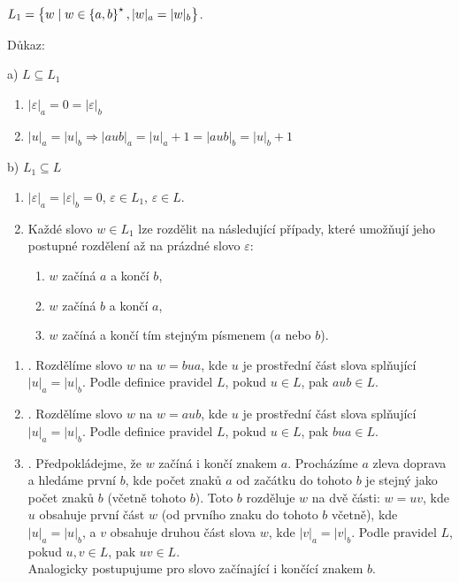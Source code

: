 $L_1 = \left\lbrace w \mid w \in \left\lbrace a,b \right\rbrace^\star, |w|_a=|w|_b \right\rbrace$.

Důkaz:

a) $L \subseteq L_1$

\begin{enumerate}
    \item $|\varepsilon|_a = 0 = |\varepsilon|_b$
    \item $|u|_a = |u|_b \Rightarrow |aub|_a = |u|_a + 1 = |aub|_b = |u|_b + 1$
\end{enumerate}

b) $L_1 \subseteq L$

\begin{enumerate}
    \item $|\varepsilon|_a = |\varepsilon|_b = 0$, $\varepsilon \in L_1$, $\varepsilon \in L$.
    \item Každé slovo $w \in L_1$ lze rozdělit na následující případy, které umožňují jeho postupné rozdělení až na
    prázdné slovo $\varepsilon$:
    \begin{enumerate}[label={}, noitemsep]
        \item {} $w$ začíná $a$ a končí $b$,
        \item {} $w$ začíná $b$ a končí $a$,
        \item {} $w$ začíná a končí tím stejným písmenem ($a$ nebo $b$).
    \end{enumerate}
\end{enumerate}

\begin{enumerate}[label={}]
    \item {}. Rozdělíme slovo $w$ na $w = bua$, kde $u$ je prostřední část slova splňující
    $|u|_a = |u|_b$. Podle definice pravidel $L$, pokud $u \in L$, pak $aub \in L$.
    \item {}. Rozdělíme slovo $w$ na $w = aub$, kde $u$ je prostřední část slova splňující
    $|u|_a = |u|_b$. Podle definice pravidel $L$, pokud $u \in L$, pak $bua \in L$.
    \item {}. Předpokládejme, že $w$ začíná i končí znakem $a$. Procházíme $a$ zleva
    doprava a hledáme první $b$, kde počet znaků $a$ od začátku do tohoto $b$ je stejný jako počet znaků $b$ (včetně
    tohoto $b$). Toto $b$ rozděluje $w$ na dvě části: $w = uv$, kde $u$ obsahuje první část $w$ (od prvního znaku do
    tohoto $b$ včetně), kde $|u|_a = |u|_b$, a $v$ obsahuje druhou část slova $w$, kde $|v|_a = |v|_b$. Podle pravidel
    $L$, pokud $u, v \in L$, pak $uv \in L$. \\
    Analogicky postupujume pro slovo začínající i končící znakem $b$.
\end{enumerate}

